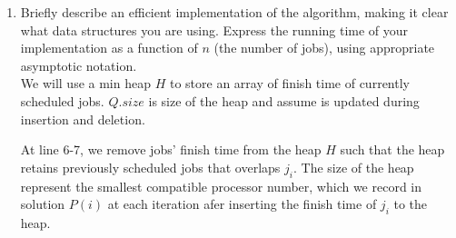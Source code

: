 \documentclass[11pt]{article}
\begin{document}
\begin{enumerate}
  \item Briefly describe an efficient implementation of the algorithm, making it clear what data structures you are using. Express the running time of your implementation as a function of $n$ (the number of jobs), using appropriate asymptotic notation.\\

  We will use a min heap $H$ to store an array of finish time of currently scheduled jobs. $Q.size$ is size of the heap and assume is updated during insertion and deletion.

    \begin{algorithm}[H]
     \end{algorithm}

     At line 6-7, we remove jobs' finish time from the heap $H$ such that the heap retains previously scheduled jobs that overlaps $j_i$. The size of the heap represent the smallest compatible processor number, which we record in solution $P(i)$ at each iteration afer inserting the finish time of $j_i$ to the heap. \\


\end{enumerate}
\end{document}
